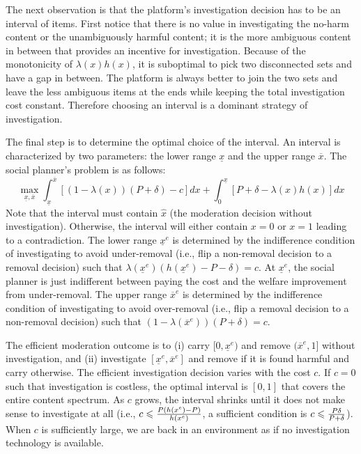 The next observation is that the platform's investigation decision has to be an interval of items. First notice that there is no value in investigating the no-harm content or the unambiguously harmful content; it is the more ambiguous content in between that provides an incentive for investigation. 
Because of the monotonicity of $\lambda(x)h(x)$, it is suboptimal to pick two disconnected sets and have a gap in between. The platform is always better to join the two sets and leave the less ambiguous items at the ends while keeping the total investigation cost constant. Therefore choosing an interval is a dominant strategy of investigation. 

The final step is to determine the optimal choice of the interval. 
An interval is characterized by two parameters: the lower range $\underline{x}$ and the upper range $\overline{x}$. The social planner's problem is as follows:
\begin{equation}
    \max_{\underline{x},\overline{x}} \int_{\underline{x}}^{\overline{x}} [(1-\lambda(x))(P+\delta)-c]dx + \int_0^{\underline{x}} [P+\delta-\lambda(x)h(x)]dx 
\end{equation}
Note that the interval must contain $\hat{x}$ (the moderation decision without investigation). Otherwise, the interval will either contain $x=0$ or $x=1$ leading to a contradiction. 
The lower range $\underline{x}^e$ is determined by the indifference condition of investigating to avoid under-removal (i.e., flip a non-removal decision to a removal decision) such that $\lambda(\underline{x}^e)(h(\underline{x}^e)-P-\delta)=c$. At $\underline{x}^e$, the social planner is just indifferent between paying the cost and the welfare improvement from under-removal. 
The upper range $\overline{x}^e$ is determined by the indifference condition of investigating to avoid over-removal (i.e., flip a removal decision to a non-removal decision) such that $(1-\lambda(\overline{x}^e))(P+\delta)=c$. 

The efficient moderation outcome is to (i) carry $[0,\underline{x}^e)$ and remove $(\overline{x}^e,1]$ without investigation, and (ii) investigate $[\underline{x}^e,\overline{x}^e]$ and remove if it is found harmful and carry otherwise.  
The efficient investigation decision varies with the cost $c$. If $c=0$ such that investigation is costless, the optimal interval is $[0,1]$ that covers the entire content spectrum. As $c$ grows, the interval shrinks until it does not make sense to investigate at all (i.e., $c\leqslant\frac{P(h(x^e)-P)}{h(x^e)}$, a sufficient condition is $c\leqslant\frac{P\delta}{P+\delta}$). When $c$ is sufficiently large, we are back in an environment as if no investigation technology is available.


